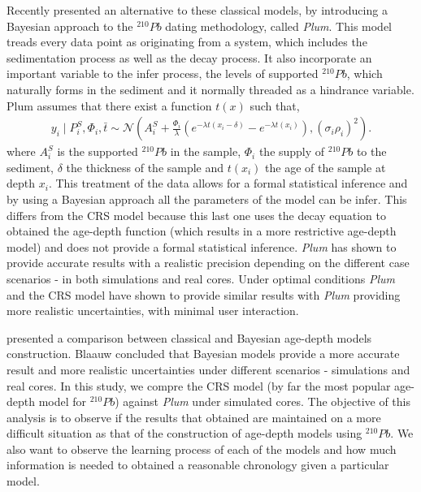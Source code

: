 \documentclass [10pt] {article}
\begin{document}
Recently \citet{Aquino2018} presented an alternative to these classical models, by introducing a Bayesian approach to the $^{210}Pb$ dating methodology, called \textit{Plum}. 
This model treads every data point as originating from a system, which includes the sedimentation process as well as the decay process. 
It also incorporate an important variable to the infer process, the levels of supported $^{210}Pb$, which naturally forms in the sediment and it normally threaded as a hindrance variable.
Plum assumes that there exist a function $t(x)$ such that,
\begin{eqnarray}
y_i\mid P^S_i, \Phi_i, \bar{t}\sim \mathcal{N} \left(A^S_i+\frac{\Phi_i}{\lambda} \left( e^{-\lambda t(x_i-\delta)} - e^{-\lambda t(x_i)} \right), (\sigma_i\rho_i)^2 \right). 
\end{eqnarray}
where $A_i^S$ is the supported $^{210}Pb$ in the sample, $\Phi_i$ the supply of $^{210}Pb$ to the sediment, $\delta$ the thickness of the sample and $t(x_i)$ the age of the sample at depth $x_i$. 
This treatment of the data allows for a formal statistical inference and by using a Bayesian approach all the parameters of the model can be infer.
This differs from the CRS model because this last one uses the decay equation to obtained the age-depth function (which results in a more restrictive age-depth model) and does not provide a formal statistical inference.
\textit{Plum} has shown to provide accurate results with a realistic precision depending on the different case scenarios \citep{Aquino2020} - in both simulations and real cores.
Under optimal conditions \textit{Plum} and the CRS model have shown to provide similar results \citep{Aquino2020} with \textit{Plum} providing more realistic uncertainties, with minimal user interaction. 

\citet{Blaauw2018} presented a comparison between classical and Bayesian age-depth models construction.
Blaauw concluded that Bayesian models provide a more accurate result and more realistic uncertainties under different scenarios - simulations and real cores.  
In this study, we compre the CRS model (by far the most popular age-depth model for $^{210}Pb$) against \textit{Plum} under simulated cores.
The objective of this analysis is to observe if the results that \citet{Blaauw2018} obtained are maintained on a more difficult situation as that of the construction of age-depth models using $^{210}Pb$.
We also want to observe the learning process of each of the models and how much information is needed to obtained a reasonable chronology given a particular model. 
\end{document}
